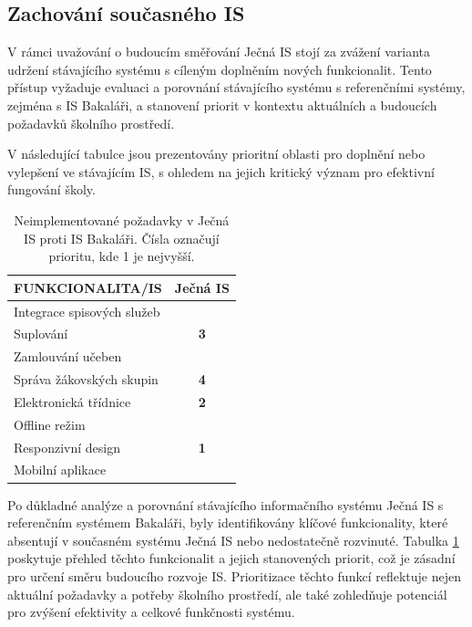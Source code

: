 \documentclass[FM,Proj]{tulthesis}
\newcommand{\ccrossmark}{{\color[HTML]{CB0000} \XSolid}}
\begin{document}

\subsection{Zachování současného IS}
V rámci uvažování o budoucím směřování Ječná IS stojí za zvážení varianta udržení stávajícího 
systému s cíleným doplněním nových funkcionalit. Tento přístup vyžaduje evaluaci a porovnání 
stávajícího systému s referenčními systémy, zejména s IS Bakaláři, a stanovení priorit 
v kontextu aktuálních a budoucích požadavků školního prostředí.

V následující tabulce jsou prezentovány prioritní oblasti pro doplnění nebo vylepšení
ve stávajícím IS, s ohledem na jejich kritický význam pro efektivní fungování školy.

\begin{table}[H]
    \centering
    \begin{tabular}{|l|c|}
    \hline
    \textbf{FUNKCIONALITA/IS}  & \textbf{Ječná IS} \\ \hline
    Integrace spisových služeb & \ccrossmark        \\ \hline
    Suplování                  & \textbf{3}        \\ \hline
    Zamlouvání učeben          & \ccrossmark        \\ \hline
    Správa žákovských skupin   & \textbf{4}        \\ \hline
    Elektronická třídnice      & \textbf{2}        \\ \hline
    Offline režim              & \ccrossmark        \\ \hline
    Responzivní design         & \textbf{1}        \\ \hline
    Mobilní aplikace           & \ccrossmark        \\ \hline
    \end{tabular}
    \caption{Neimplementované požadavky v Ječná IS proti IS Bakaláři. 
    Čísla označují prioritu, kde 1 je nejvyšší.}
    \label{analysis:priorities}
\end{table}

Po důkladné analýze a porovnání stávajícího informačního systému Ječná IS 
s referenčním systémem Bakaláři, byly identifikovány klíčové funkcionality,
které absentují v současném systému Ječná IS nebo nedostatečně rozvinuté.
Tabulka \ref{analysis:priorities} poskytuje přehled těchto funkcionalit 
a jejich stanovených priorit, což je zásadní pro určení směru budoucího
rozvoje IS. Prioritizace těchto funkcí reflektuje nejen aktuální požadavky
a potřeby školního prostředí, ale také zohledňuje potenciál pro zvýšení 
efektivity a celkové funkčnosti systému.
\end{document}
